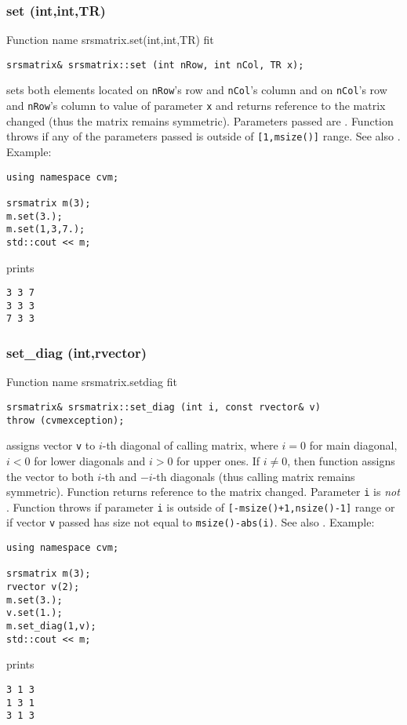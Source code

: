 \subsubsection{set (int,int,TR)}
Function%
\pdfdest name {srsmatrix.set(int,int,TR)} fit
\begin{verbatim}
srsmatrix& srsmatrix::set (int nRow, int nCol, TR x);
\end{verbatim}
sets both elements located on \verb"nRow"'s row
and \verb"nCol"'s column and on 
\verb"nCol"'s row
and \verb"nRow"'s column to  value of
parameter \verb"x" and returns  reference to
the matrix changed (thus the matrix remains symmetric).
Parameters passed 
are \Based.
Function throws 
if any of the parameters passed
is outside of \verb"[1,msize()]" range.
See also .
Example:
\begin{Verbatim}
using namespace cvm;

srsmatrix m(3);
m.set(3.);
m.set(1,3,7.);
std::cout << m;
\end{Verbatim}
prints
\begin{Verbatim}
3 3 7
3 3 3
7 3 3
\end{Verbatim}
\newpage



\subsubsection{set\_diag (int,rvector)}
Function%
\pdfdest name {srsmatrix.setdiag} fit
\begin{verbatim}
srsmatrix& srsmatrix::set_diag (int i, const rvector& v)
throw (cvmexception);
\end{verbatim}
assigns vector \verb"v"
to \hbox{$i$-th} diagonal of calling matrix,
where $i=0$ for main diagonal, $i<0$ for lower diagonals 
and $i>0$ for upper ones.
If $i\not=0$, then  function assigns the vector
to both $i$-th and $-i$-th diagonals
(thus calling matrix remains symmetric).
Function returns  reference to the matrix changed.
Parameter \verb"i" is \emph{not} \Based.
Function throws 
if parameter \verb"i" is outside of 
\verb"[-msize()+1,nsize()-1]" range or if
vector \verb"v" passed has  size not equal to
\verb"msize()-abs(i)".
See also .
Example:
\begin{Verbatim}
using namespace cvm;

srsmatrix m(3);
rvector v(2);
m.set(3.);
v.set(1.);
m.set_diag(1,v);
std::cout << m;
\end{Verbatim}
prints
\begin{Verbatim}
3 1 3
1 3 1
3 1 3
\end{Verbatim}
\newpage



